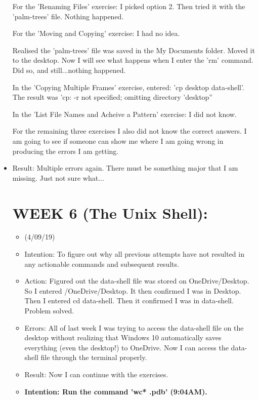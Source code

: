 \documentclass[a4paper,12pt]{article}
\begin{document}
\begin{itemize}
For the 'Renaming Files' exercise: I picked option 2. Then tried it with the 'palm-trees' file. Nothing happened. 

For the 'Moving and Copying' exercise: I had no idea.

Realised the 'palm-trees' file was saved in the My Documents folder. Moved it to the desktop. Now I will see what happens when I enter the 'rm' command. Did so, and still...nothing happened. 

In the 'Copying Multiple Frames' exercise, entered: 'cp desktop data-shell'. The result was 'cp: -r not specified; omitting directory 'desktop''

In the 'List File Names and Acheive a Pattern' exercise: I did not know. 

For the remaining three exercises I also did not know the correct answers. I am going to see if someone can show me where I am going wrong in producing the errors I am getting.

\item Result: Multiple errors again. There must be something major that I am missing. Just not sure what...

\section{WEEK 6 (The Unix Shell):}

\begin{itemize}
\item
(4/09/19)

\item Intention: To figure out why all previous attempts have not resulted in any actionable commands and subsequent results. 

\item Action: Figured out the data-shell file was stored on OneDrive/Desktop. So I entered /OneDrive/Desktop. It then confirmed I was in Desktop. Then I entered cd data-shell. Then it confirmed I was in data-shell. Problem solved. 

\item Errors: All of last week I was trying to access the data-shell file on the desktop without realizing that Windows 10 automatically saves everything (even the desktop!) to OneDrive. Now I can access the data-shell file through the terminal properly. 

\item Result: Now I can continue with the exercises. 


\item \textbf{Intention: Run the command 'wc* .pdb' (9:04AM).}


\end{itemize}
\end{itemize}
\end{document}
